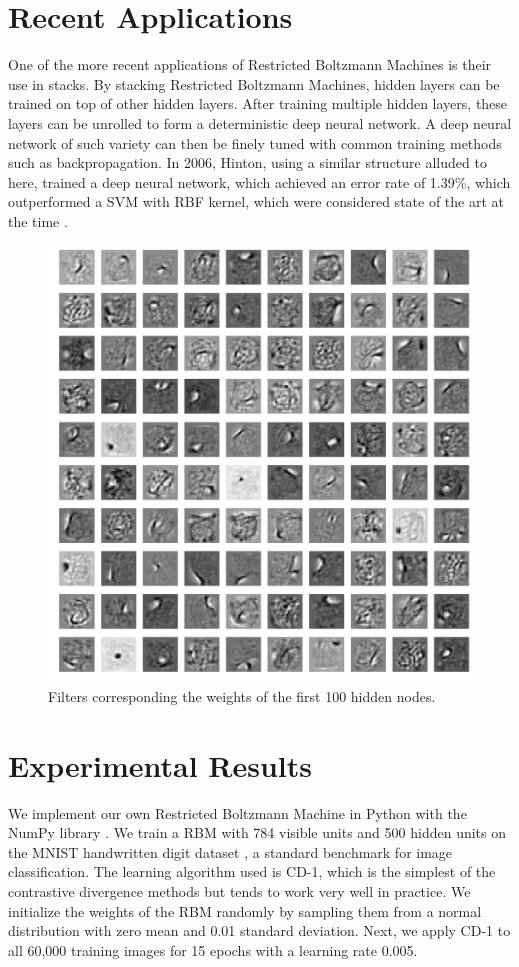 \documentclass[journal]{IEEEtran}
\begin{document}
\section{Recent Applications}
One of the more recent applications of Restricted Boltzmann Machines is their use in stacks.  By stacking Restricted Boltzmann Machines, hidden layers can be trained on top of other hidden layers. After training multiple hidden layers, these layers can be unrolled to form a deterministic deep neural network.  A deep neural network of such variety can then be finely tuned with common training methods such as backpropagation.  In 2006, Hinton, using a similar structure alluded to here, trained a deep neural network, which achieved an error rate of 1.39\%, which outperformed a SVM with RBF kernel, which were considered state of the art at the time \cite{hinton2006fast}.

\begin{figure}[h]
  \centering
  \includegraphics[width=0.9\linewidth]{filters.png}
  \caption{Filters corresponding the weights of the first 100 hidden nodes.}
  \label{filters}
\end{figure}

\section{Experimental Results}
We implement our own Restricted Boltzmann Machine in Python with the NumPy library \cite{oliphant2006guide}. We train a RBM with 784 visible units and 500 hidden units on the MNIST handwritten digit dataset \cite{deng2012mnist}, a standard benchmark for image classification. The learning algorithm used is CD-1, which is the simplest of the contrastive divergence methods but tends to work very well in practice. We initialize the weights of the RBM randomly by sampling them from a normal distribution with zero mean and 0.01 standard deviation. Next, we apply CD-1 to all 60,000 training images for 15 epochs with a learning rate 0.005.
\end{document}
